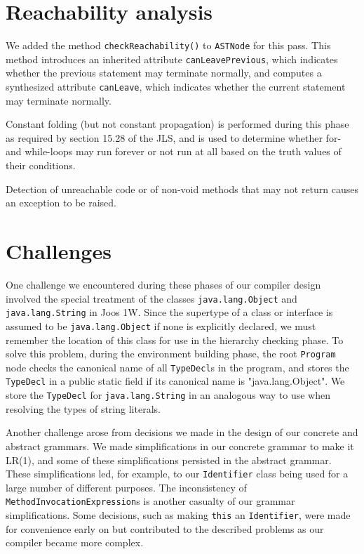 \documentclass[12pt]{article}
\newcommand{\code}[1]{\texttt{#1}}
\begin{document}
\section{Reachability analysis}

We added the method \code{checkReachability()} to \code{ASTNode} for this pass.  This method introduces an inherited attribute \code{canLeavePrevious}, which indicates whether the previous statement may terminate normally, and computes a synthesized attribute \code{canLeave}, which indicates whether the current statement may terminate normally.

Constant folding (but not constant propagation) is performed during this phase as required by section 15.28 of the JLS, and is used to determine whether for- and while-loops may run forever or not run at all based on the truth values of their conditions.

Detection of unreachable code or of non-void methods that may not return causes an exception to be raised.

\section{Challenges}

One challenge we encountered during these phases of our compiler design involved the special treatment of the classes \code{java.lang.Object} and \code{java.lang.String} in Joos 1W. Since the supertype of a class or interface is assumed to be \code{java.lang.Object} if none is explicitly declared, we must remember the location of this class for use in the hierarchy checking phase. To solve this problem, during the environment building phase, the root \code{Program} node checks the canonical name of all \code{TypeDecl}s in the program, and stores the \code{TypeDecl} in a public static field if its canonical name is "java.lang.Object". We store the \code{TypeDecl} for \code{java.lang.String} in an analogous way to use when resolving the types of string literals.

Another challenge arose from decisions we made in the design of our concrete and abstract grammars. We made simplifications in our concrete grammar to make it LR(1), and some of these simplifications persisted in the abstract grammar. These simplifications led, for example, to our \code{Identifier} class being used for a large number of different purposes. The inconsistency of \code{MethodInvocationExpression}s is another casualty of our grammar simplifications. Some decisions, such as making \code{this} an \code{Identifier}, were made for convenience early on but contributed to the described problems as our compiler became more complex.
\end{document}
